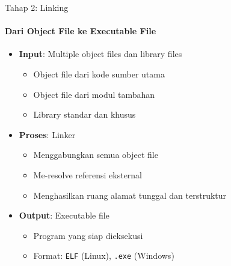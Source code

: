 \documentclass[10pt,aspectratio=169]{beamer}
\begin{document}
\begin{frame}{Tahap 2: Linking}
    \framesubtitle{Dari Object File ke Executable File}
    
    \begin{itemize}
        \item \textbf{Input}: Multiple object files dan library files
        \begin{itemize}
            \item Object file dari kode sumber utama
            \item Object file dari modul tambahan
            \item Library standar dan khusus
        \end{itemize}
        
        \item \textbf{Proses}: Linker
        \begin{itemize}
            \item Menggabungkan semua object file
            \item Me-resolve referensi eksternal
            \item Menghasilkan ruang alamat tunggal dan terstruktur
        \end{itemize}
        
        \item \textbf{Output}: Executable file
        \begin{itemize}
            \item Program yang siap dieksekusi
            \item Format: \texttt{ELF} (Linux), \texttt{.exe} (Windows)
        \end{itemize}
    \end{itemize}
\end{frame}
\end{document}
